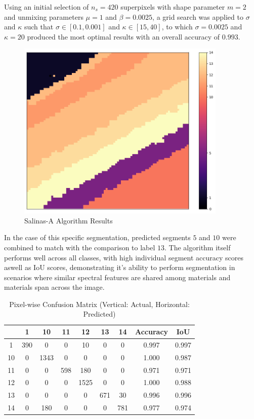 \clearpage

Using an initial selection of $n_s = 420$ superpixels with shape parameter $m=2$ and unmixing parameters $\mu = 1$ and $\beta = 0.0025$, a grid search was applied to $\sigma$ and $\kappa$ such that $\sigma \in [0.1, 0.001]$ and $\kappa \in [15, 40]$, to which $\sigma = 0.0025$ and $\kappa = 20$ produced the most optimal results with an overall accuracy of $0.993$.
\begin{figure}[H]
    \centering
    \includegraphics[width=10cm]{salinas-a-labelled.png}  %
    \caption{Salinas-A Algorithm Results}
    \label{salina-a-results}  %
\end{figure}

In the case of this specific segmentation, predicted segments $5$ and $10$ were combined to match with the comparison to label $13$. The algorithm itself performs well across all classes, with high individual segment accuracy scores aswell as IoU scores, demonstrating it's ability to perform segmentation in scenarios where similar spectral features are shared among materials and materials span across the image.
\begin{table}[H]
    \centering
    \label{tab:salinas_cfm}
    \begin{tabular}{|c|cccccc|c|c|}
        \hline
         & \textbf{1} & \textbf{10} & \textbf{11} & \textbf{12} & \textbf{13} & \textbf{14} & \textbf{Accuracy} & \textbf{IoU} \\ \hline
        1      &  390    &  0    &  0    &  10    &  0    &  0    &  0.997 & 0.997  \\ 
        10      &  0    & 1343  &  0    &  0    &  0    &  0     &  1.000   & 0.987\\ 
        11      &  0    &  0    &  598  &  180   &  0    &  0    &  0.971  & 0.971\\ 
        12      &  0    &  0    &  0    & 1525  &  0    &  0    &  1.000  & 0.988\\ 
        13      &  0    &  0    &  0    &  0    &  671  &  30    &  0.996  & 0.996\\ 
        14      &  0    &  180   &  0    &  0    &  0    &  781  &  0.977  & 0.974\\ \hline
    \end{tabular}
    \caption{Pixel-wise Confusion Matrix (Vertical: Actual, Horizontal: Predicted)}
\end{table}

